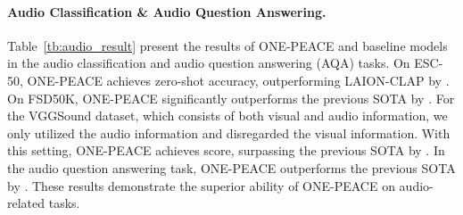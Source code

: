 \documentclass{article}
\newcommand{\onepeace}{ONE-PEACE\xspace}
\begin{document}
\paragraph{Audio Classification \& Audio Question Answering.}
Table~\ref{tb:audio_result} present the results of \onepeace and baseline models in the audio classification and audio question answering (AQA) tasks.
On ESC-50, \onepeace achieves  zero-shot accuracy, outperforming LAION-CLAP by .
On FSD50K, \onepeace significantly outperforms the previous SOTA by .
For the VGGSound dataset, which consists of both visual and audio information, we only utilized the audio information and disregarded the visual information. 
With this setting, \onepeace achieves  score, surpassing the previous SOTA by .
In the audio question answering task, \onepeace outperforms the previous SOTA by .
These results demonstrate the superior ability of \onepeace on audio-related tasks.
\end{document}
